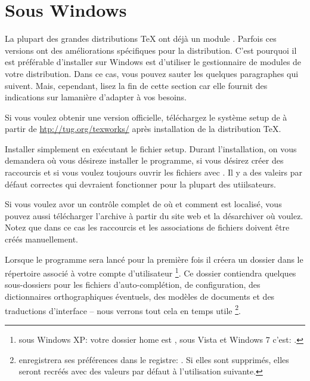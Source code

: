 \section{Sous Windows}

La plupart des grandes distributions \TeX{} ont déjà un module \Tw. Parfois ces versions ont des améliorations spécifiques pour la distribution. C'est pourquoi il est préférable d'installer \Tw{} sur Windows est d'utiliser le gestionnaire de modules de votre distribution. Dans ce cas, vous pouvez sauter les quelques paragraphes qui suivent. Mais, cependant, lisez la fin de cette section car elle fournit des indications sur lamanière d'adapter \Tw{} à vos besoins.

Si vous voulez obtenir une version \og officielle\fg, téléchargez le système setup de \Tw{} à partir de  \url{htp://tug.org/texworks/}  après installation de la distribution \TeX.

Installer simplement \Tw{} en exécutant le fichier setup. Durant l'installation, on vous demandera où vous désireze installer le programme, si vous désirez créer des raccourcis et si vous voulez toujours ouvrir les fichiers  avec \Tw. Il y a des valeirs par défaut correctes qui devraient fonctionner pour la plupart des utiilsateurs.

Si vous voulez avor un contrôle complet de où et comment \Tw{} est localisé, vous pouvez aussi télécharger l'archive  à partir du site web et la désarchiver où voulez. Notez que dans ce cas les raccourcis et les associations de fichiers doivent être créés manuellement.

\urldef{\TwRegistryPath}

Lorsque le programme sera lancé pour la première fois il créera un dossier  dans le répertoire associé à votre compte d'utilisateur \footnote{sous Windows XP: votre dossier home est , sous Vista et Windows 7 c'est: .}. Ce dossier contiendra quelques sous-dossiers pour les fichiers d'auto-complé\-tion, de configuration, des dictionnaires orthographiques éventuels, des modèles de documents et des traductions d'interface -- nous verrons tout cela en temps utile \footnote{\Tw{} enregistrera ses préférences dans le registre:
\TwRegistryPath. Si elles sont supprimés, elles seront recréés avec des valeurs par défaut à l'utilisation suivante.}.

